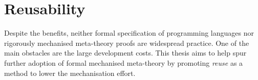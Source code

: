 {%


\section{Reusability}

Despite the benefits, neither formal specification of programming languages nor
rigorously mechanised meta-theory proofs are widespread practice. One of the
main obstacles are the large development costs. This thesis aims to help spur
further adoption of formal mechanised meta-theory by promoting \emph{reuse} as a
method to lower the mechanisation effort.

}

